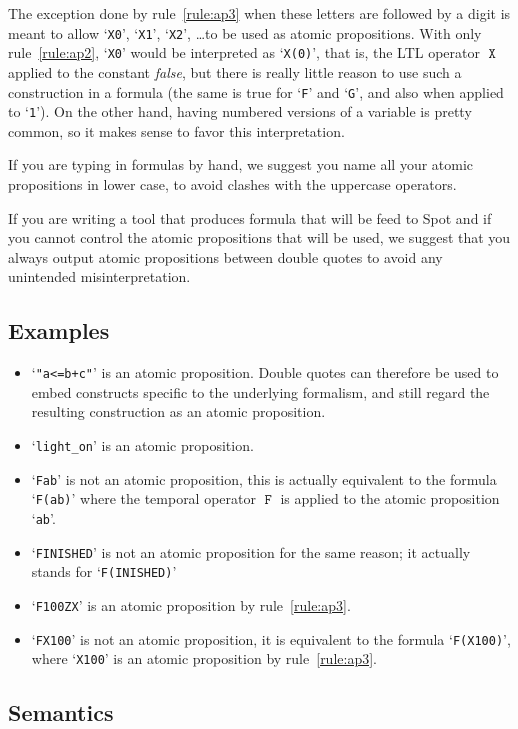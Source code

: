 \documentclass[a4paper,twoside,10pt,DIV=12]{scrreprt}
\DeclareMathOperator{\F}{\texttt{F}}
\DeclareMathOperator{\X}{\texttt{X}}
\newcommand{\0}{\texttt{0}}
\newcommand{\1}{\texttt{1}}
\newcommand\samp[1]{`\texttt{#1}'}
\begin{document}
The exception done by rule~\ref{rule:ap3} when these letters are
followed by a digit is meant to allow \samp{X0}, \samp{X1}, \samp{X2},
\dots to be used as atomic propositions.  With only
rule~\ref{rule:ap2}, \samp{X0} would be interpreted as \samp{X(0)},
that is, the LTL operator $\X$ applied to the constant \textit{false},
but there is really little reason to use such a construction in a
formula (the same is true for \samp{F} and \samp{G}, and also when
applied to \samp{1}).  On the other hand, having numbered versions of
a variable is pretty common, so it makes sense to favor this
interpretation.

If you are typing in formulas by hand, we suggest you name all your
atomic propositions in lower case, to avoid clashes with the uppercase
operators.

If you are writing a tool that produces formula that will be feed to
Spot and if you cannot control the atomic propositions that will be
used, we suggest that you always output atomic propositions between
double quotes to avoid any unintended misinterpretation.


\subsection{Examples}

\begin{itemize}
\item \samp{"a<=b+c"} is an atomic proposition.  Double quotes can
  therefore be used to embed constructs specific to the underlying formalism,
  and still regard the resulting construction as an atomic proposition.
\item \samp{light\_on} is an atomic proposition.
\item \samp{Fab} is not an atomic proposition, this is actually
  equivalent to the formula \samp{F(ab)} where the temporal operator
  $\F$ is applied to the atomic proposition \samp{ab}.
\item \samp{FINISHED} is not an atomic proposition for the same
  reason; it actually stands for \samp{F(INISHED)}
\item \samp{F100ZX} is an atomic proposition by rule~\ref{rule:ap3}.
\item \samp{FX100} is not an atomic proposition, it is equivalent to the
  formula \samp{F(X100)}, where \samp{X100} is an atomic proposition
  by rule~\ref{rule:ap3}.
\end{itemize}

\subsection{Semantics}
\end{document}

